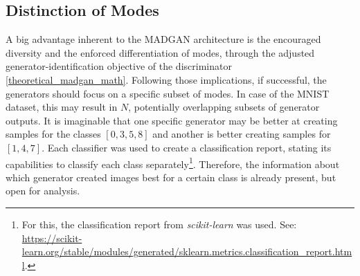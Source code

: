 \subsection{Distinction of Modes}
\noindent A big advantage inherent to the MADGAN architecture is the encouraged diversity and the enforced differentiation of modes, through the adjusted generator-identification objective of the discriminator \ref{theoretical_madgan_math}. Following those implications, if successful, the generators should focus on a specific subset of modes. In case of the MNIST dataset, this may result in $N$, potentially overlapping subsets of generator outputs. It is imaginable that one specific generator may be better at creating samples for the classes \([0, 3, 5, 8]\) and another is better creating samples for \([1, 4, 7]\). 
Each classifier was used to create a classification report, stating its capabilities to classify each class separately\footnote{For this, the classification report from \textit{scikit-learn} was used. See: \url{https://scikit-learn.org/stable/modules/generated/sklearn.metrics.classification_report.html}.}. Therefore, the information about which generator created images best for a certain class is already present, but open for analysis.

\newpage